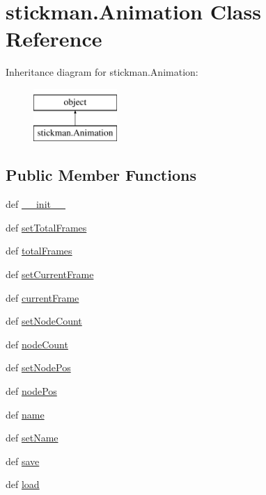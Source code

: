 \hypertarget{classstickman_1_1Animation}{}\section{stickman.\+Animation Class Reference}
\label{classstickman_1_1Animation}
Inheritance diagram for stickman.\+Animation\+:\begin{figure}[H]
\begin{center}
\leavevmode
\includegraphics[height=2.000000cm]{classstickman_1_1Animation}
\end{center}
\end{figure}
\subsection*{Public Member Functions}
\begin{DoxyCompactItemize}
\item 
def \hyperlink{classstickman_1_1Animation_a6c4c27efab631492662a95b840bc6e27}{\+\_\+\+\_\+init\+\_\+\+\_\+}
\item 
def \hyperlink{classstickman_1_1Animation_a7468055bf572e7eaa8d91ee03c554846}{set\+Total\+Frames}
\item 
def \hyperlink{classstickman_1_1Animation_a9514cd37323a972cb6a4a2fcadd66ccc}{total\+Frames}
\item 
def \hyperlink{classstickman_1_1Animation_a1906a465e759b153ae2bc8520af83776}{set\+Current\+Frame}
\item 
def \hyperlink{classstickman_1_1Animation_af30d5ceff7fd8d4c602457ea9e08a031}{current\+Frame}
\item 
def \hyperlink{classstickman_1_1Animation_a56a78990cc7012d6a42bd67c3c2c77ed}{set\+Node\+Count}
\item 
def \hyperlink{classstickman_1_1Animation_a71d92245fd9841e39de1adb30236970d}{node\+Count}
\item 
def \hyperlink{classstickman_1_1Animation_ad676462e8d9087be6ecc4e85e35af577}{set\+Node\+Pos}
\item 
def \hyperlink{classstickman_1_1Animation_abee5f9f773966bf494268c81358caa2c}{node\+Pos}
\item 
def \hyperlink{classstickman_1_1Animation_a99ed5a86ecb21ae77fb1d1fea0f0ff91}{name}
\item 
def \hyperlink{classstickman_1_1Animation_a9d71e61399cae3352f7fcf4fcaec8f36}{set\+Name}
\item 
def \hyperlink{classstickman_1_1Animation_a2a3f51f4be11010b33bf27c1a2945cba}{save}
\item 
def \hyperlink{classstickman_1_1Animation_aebf8c35b4a067ddd1a8aba7d0486f160}{load}
\end{DoxyCompactItemize}

